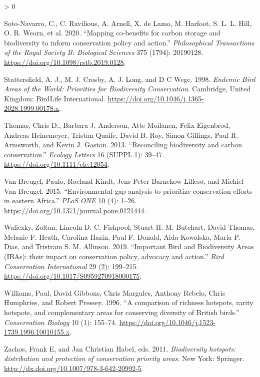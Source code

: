 \documentclass[
]{article}
\newlength{\cslhangindent}
\newenvironment{CSLReferences}[2] %
 {%
  \setlength{\parindent}{0pt}
  \ifodd #1 \everypar{\setlength{\hangindent}{\cslhangindent}}\ignorespaces\fi
  \ifnum #2 > 0
  \setlength{\parskip}{#2\baselineskip}
  \fi
 }%
 {}
\begin{document}
\begin{CSLReferences}{1}{0}
\leavevmode\hypertarget{ref-Soto-Navarro2020}{}%
Soto-Navarro, C., C. Ravilious, A. Arnell, X. de Lamo, M. Harfoot, S. L. L. Hill, O. R. Wearn, et al. 2020. {``{Mapping co-benefits for carbon storage and biodiversity to inform conservation policy and action}.''} \emph{Philosophical Transactions of the Royal Society B: Biological Sciences} 375 (1794): 20190128. \url{https://doi.org/10.1098/rstb.2019.0128}.

\leavevmode\hypertarget{ref-Stattersfield1998}{}%
Stattersfield, A. J., M. J. Crosby, A. J. Long, and D C Wege. 1998. \emph{{Endemic Bird Areas of the World: Priorities for Biodiversity Conservation}}. Cambridge, United Kingdom: BirdLife International. \url{https://doi.org/10.1046/j.1365-2028.1999.00178.x}.

\leavevmode\hypertarget{ref-Thomas2013}{}%
Thomas, Chris D., Barbara J. Anderson, Atte Moilanen, Felix Eigenbrod, Andreas Heinemeyer, Tristan Quaife, David B. Roy, Simon Gillings, Paul R. Armsworth, and Kevin J. Gaston. 2013. {``{Reconciling biodiversity and carbon conservation}.''} \emph{Ecology Letters} 16 (SUPPL.1): 39--47. \url{https://doi.org/10.1111/ele.12054}.

\leavevmode\hypertarget{ref-VanBreugel2015}{}%
Van Breugel, Paulo, Roeland Kindt, Jens Peter Barnekow Lillesø, and Michiel Van Breugel. 2015. {``{Environmental gap analysis to prioritize conservation efforts in eastern Africa}.''} \emph{PLoS ONE} 10 (4): 1--26. \url{https://doi.org/10.1371/journal.pone.0121444}.

\leavevmode\hypertarget{ref-Waliczky2019}{}%
Waliczky, Zoltan, Lincoln D. C. Fishpool, Stuart H. M. Butchart, David Thomas, Melanie F. Heath, Carolina Hazin, Paul F. Donald, Aida Kowalska, Maria P. Dias, and Tristram S. M. Allinson. 2019. {``{Important Bird and Biodiversity Areas (IBAs): their impact on conservation policy, advocacy and action}.''} \emph{Bird Conservation International} 29 (2): 199--215. \url{https://doi.org/10.1017/S0959270918000175}.

\leavevmode\hypertarget{ref-Williams1996}{}%
Williams, Paul, David Gibbons, Chris Margules, Anthony Rebelo, Chris Humphries, and Robert Pressey. 1996. {``{A comparison of richness hotspots, rarity hotspots, and complementary areas for conserving diversity of British birds}.''} \emph{Conservation Biology} 10 (1): 155--74. \url{https://doi.org/10.1046/j.1523-1739.1996.10010155.x}.

\leavevmode\hypertarget{ref-Zachos2011}{}%
Zachos, Frank E, and Jan Christian Habel, eds. 2011. \emph{{Biodiversity hotspots: distribution and protection of conservation priority areas}}. New York: Springer. \url{http://dx.doi.org/10.1007/978-3-642-20992-5}.

\end{CSLReferences}
\end{document}
